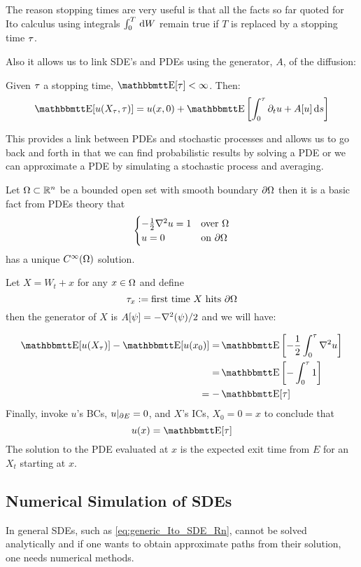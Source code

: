 The reason stopping times are very useful is that all the facts so far quoted
for Ito calculus using integrals $\int_0^T \, \mathrm{d} W$ remain true if $T$ is
replaced by a stopping time ${\tau}$.
 
Also it allows us to link SDE's and PDEs using the generator, $A$, of the
diffusion: 
\begin{thm} Given ${\tau}$ a stopping time, $\Exp[\t] < \infty$.
Then:
$$
\Exp[u(X_\t, \t)] =
u(x, 0) + \Exp\left[\int_0^\t \di_t u + A[u] \intd{s}
\right]
 $$
\end{thm}
This provides a link between PDEs and stochastic processes and allows us to go
back and forth in that we can find probabilistic results by
solving a PDE or we can approximate a PDE by simulating a stochastic process
and averaging.

\begin{ex}
\label{ex:mean_hitting_time}
 Let ${\Omega}
\subset { \mathbb{R} }^n$ be a bounded open set with smooth boundary ${\partial} {\Omega}$ then it is a
basic fact from PDEs theory that
\begin{equation}
\begin{cases}
-\frac{1}{2} { \nabla }^2 u = 1  & \text{over } {\Omega}
\\
u =  0 &\text{on } {\partial} {\Omega}
\end{cases}
\end{equation}
has a unique $C^\infty({\Omega})$ solution.

Let $X = W_t + x$ for any $x \in {\Omega}$ and define
 $${\tau}_x := \text{first time } X \text{ hits } {\partial} {\Omega}$$
then the generator of $X$ is $A[\psi] = -{ \nabla }^2(\psi)/2$ and we will
have:

\begin{align*}
\Exp[u(X_\t)] - \Exp[ u(x_0)] =& \Exp \left[ -\frac{1}{2}\int_0^\t \grad^2
u\right]
\\
=& \Exp \left[ - \int_0^\t 1
\right]
\\
=-&\Exp [\t]
\end{align*}
Finally, invoke $u$'s BCs, $u|_{{\partial} E} = 0$, and $X$'s ICs, $X_0=0 = x$ to
conclude that $$ u(x) = \Exp [\t]$$
The solution to the PDE evaluated at $x$ is the expected exit time from
$E$ for an $X_t$  starting at $x$.
\end{ex}


\subsection{Numerical Simulation of SDEs}
In general SDEs, such as \cref{eq:generic_Ito_SDE_Rn}, cannot be solved
analytically and if one wants to obtain approximate paths from their solution,
one needs numerical methods.  

